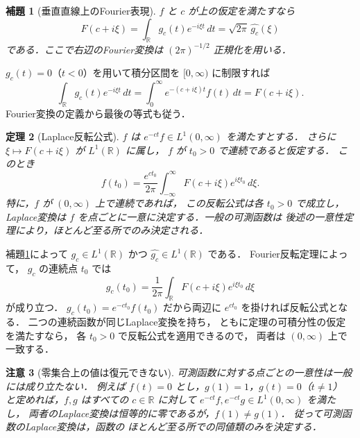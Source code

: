 \documentclass[a5paper,10pt,onecolumn]{jsarticle}
\makeatletter
\theoremstyle{mathnotetheorem}
\newtheorem{theorem}{定理}[section]
\newtheorem{lemma}[theorem]{補題}
\newtheorem{remark}[theorem]{注意}
\renewcommand{\proofname}{証明}
\renewenvironment{proof}[1][\proofname]{%
  \par\pushQED{\qed}\normalfont\topsep4\p@\@plus2\p@\relax
  \trivlist\item[\hskip\labelsep\bfseries #1]\ignorespaces
}{\popQED\endtrivlist\@endpefalse}
\makeatother
\begin{document}
\begin{lemma}[垂直直線上のFourier表現]\label{lem:vertical}
$f$ と $c$ が上の仮定を満たすなら
\[
 F(c+i\xi)
 =\int_{\mathbb R}g_c(t)e^{-i\xi t}\,dt
 =\sqrt{2\pi}\,\widehat{g_c}(\xi)
\]
である．ここで右辺のFourier変換は
$(2\pi)^{-1/2}$ 正規化を用いる．
\end{lemma}
\begin{proof}
$g_c(t)=0$（$t<0$）を用いて積分区間を
$[0,\infty)$ に制限すれば
\[
 \int_{\mathbb R}g_c(t)e^{-i\xi t}\,dt
 =\int_0^\infty e^{-(c+i\xi)t}f(t)\,dt
 =F(c+i\xi).
\]
Fourier変換の定義から最後の等式も従う．
\end{proof}

\begin{theorem}[Laplace反転公式]\label{thm:inversion}
$f$ は $e^{-ct}f\in L^1(0,\infty)$ を満たすとする．
さらに $\xi\mapsto F(c+i\xi)$ が $L^1(\mathbb R)$ に属し，
$f$ が $t_0>0$ で連続であると仮定する．
このとき
\[
 f(t_0)=\frac{e^{ct_0}}{2\pi}
 \int_{-\infty}^\infty
 F(c+i\xi)e^{i\xi t_0}\,d\xi.
\]
特に，$f$ が $(0,\infty)$ 上で連続であれば，
この反転公式は各 $t_0>0$ で成立し，Laplace変換は
$f$ を点ごとに一意に決定する．一般の可測函数は
後述の一意性定理により，ほとんど至る所でのみ決定される．
\end{theorem}
\begin{proof}
補題\ref{lem:vertical}によって
$g_c\in L^1(\mathbb R)$ かつ
$\widehat{g_c}\in L^1(\mathbb R)$ である．
Fourier反転定理によって，
$g_c$ の連続点 $t_0$ では
\[
 g_c(t_0)
 =\frac1{2\pi}\int_{\mathbb R}
 F(c+i\xi)e^{i\xi t_0}\,d\xi
\]
が成り立つ．
$g_c(t_0)=e^{-ct_0}f(t_0)$ だから両辺に
$e^{ct_0}$ を掛ければ反転公式となる．
二つの連続函数が同じLaplace変換を持ち，
ともに定理の可積分性の仮定を満たすなら，
各 $t_0>0$ で反転公式を適用できるので，
両者は $(0,\infty)$ 上で一致する．
\end{proof}

\begin{remark}[零集合上の値は復元できない]
可測函数に対する点ごとの一意性は一般には成り立たない．
例えば $f(t)=0$ とし，$g(1)=1$，$g(t)=0$（$t\ne1$）
と定めれば，$f,g$ はすべての $c\in\mathbb R$ に対して
$e^{-ct}f,e^{-ct}g\in L^1(0,\infty)$ を満たし，
両者のLaplace変換は恒等的に零であるが，$f(1)\ne g(1)$．
従って可測函数のLaplace変換は，函数の
ほとんど至る所での同値類のみを決定する．
\end{remark}
\end{document}
